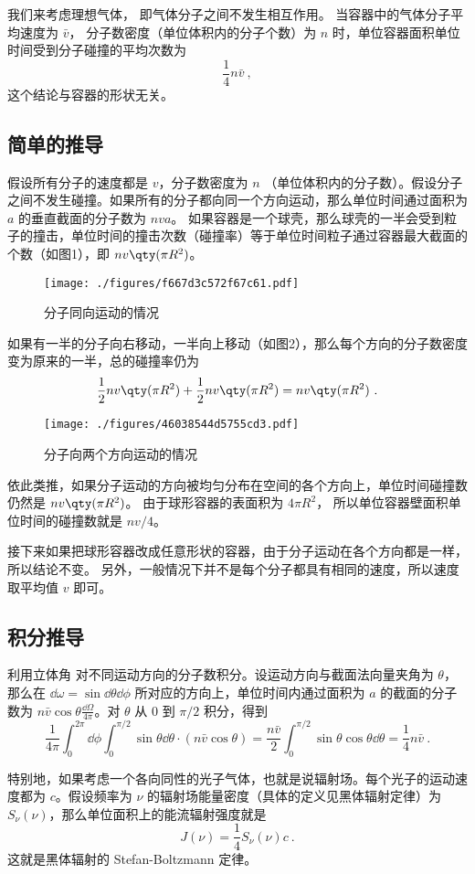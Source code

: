 

我们来考虑理想气体， 即气体分子之间不发生相互作用。 当容器中的气体分子平均速度为 $\bar v$， 分子数密度（单位体积内的分子个数）为 $n$ 时，单位容器面积单位时间受到分子碰撞的平均次数为
\begin{equation}
\frac14 n\bar v~,
\end{equation}
这个结论与容器的形状无关。

\subsection{简单的推导}

假设所有分子的速度都是 $v$，分子数密度为 $n$ （单位体积内的分子数）。假设分子之间不发生碰撞。如果所有的分子都向同一个方向运动，那么单位时间通过面积为 $a$ 的垂直截面的分子数为 $nva$。 如果容器是一个球壳，那么球壳的一半会受到粒子的撞击，单位时间的撞击次数（碰撞率）等于单位时间粒子通过容器最大截面的个数（如图1），即 $nv \qty(\pi R^2)$。 
\begin{figure}[ht]
\centering
\texttt{[image: ./figures/f667d3c572f67c61.pdf]}
\caption{分子同向运动的情况} \label{fig_AvgHit_1}
\end{figure}
如果有一半的分子向右移动，一半向上移动（如图2），那么每个方向的分子数密度变为原来的一半，总的碰撞率仍为
\begin{equation}
\frac12 nv \qty(\pi R^2) + \frac12 nv \qty(\pi R^2) = nv \qty(\pi R^2)~.
\end{equation}


\begin{figure}[ht]
\centering
\texttt{[image: ./figures/46038544d5755cd3.pdf]}
\caption{分子向两个方向运动的情况} \label{fig_AvgHit_2}
\end{figure}
依此类推，如果分子运动的方向被均匀分布在空间的各个方向上，单位时间碰撞数仍然是 $nv \qty(\pi R^2)$。
由于球形容器的表面积为 $4\pi R^2$， 所以单位容器壁面积单位时间的碰撞数就是 $nv/4$。 

接下来如果把球形容器改成任意形状的容器，由于分子运动在各个方向都是一样，所以结论不变。 另外，一般情况下并不是每个分子都具有相同的速度，所以速度取平均值 $v$ 即可。

\subsection{积分推导}

利用立体角 对不同运动方向的分子数积分。设运动方向与截面法向量夹角为 $\theta$，那么在 $\dd\omega=\sin\dd\theta\dd\phi$ 所对应的方向上，单位时间内通过面积为 $a$ 的截面的分子数为 $n\bar v\cos\theta \frac{\dd\Omega}{4\pi}$。对 $\theta$ 从 $0$ 到 $\pi/2$ 积分，得到
\begin{equation}
\frac{1}{4\pi}\int_0^{2\pi}\dd\phi\int_0^{\pi/2}\sin\theta\dd\theta \cdot (n \bar v\cos\theta)=\frac{n\bar v}{2} \int_0^{\pi/2}\sin\theta\cos\theta \dd\theta = \frac{1}{4} n\bar v ~.
\end{equation}

特别地，如果考虑一个各向同性的光子气体，也就是说辐射场。每个光子的运动速度都为 $c$。假设频率为 $\nu$ 的辐射场能量密度（具体的定义见黑体辐射定律）为 $S_\nu(\nu)$，那么单位面积上的能流辐射强度就是
\begin{equation}
J(\nu)=\frac{1}{4} S_\nu(\nu) c ~.
\end{equation}
这就是黑体辐射的 Stefan-Boltzmann 定律。

